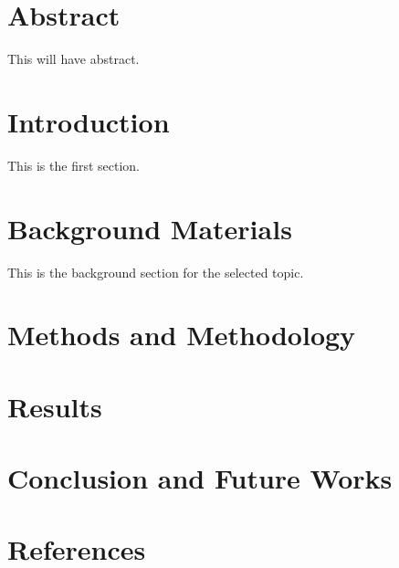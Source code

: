 \documentclass[a4paper, 11pt]{report}
\begin{document}
\begin{titlepage}
	
	\vfill %
	
\end{titlepage}

\tableofcontents

\section{Abstract}

This will have abstract.

\section{Introduction}

This is the first section.


\section{Background Materials}

This is the background section for the selected topic.

\section{Methods and Methodology}

\section{Results}

\section{Conclusion and Future Works}

\section{References}
\end{document}
